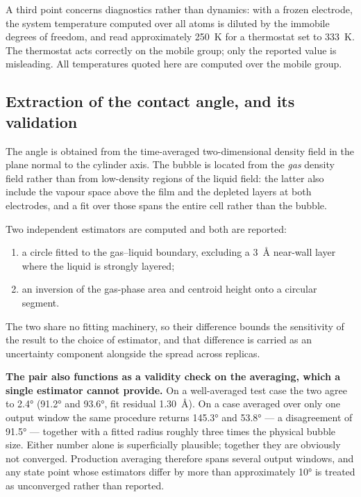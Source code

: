 \documentclass[11pt,a4paper]{article}
\begin{document}
A third point concerns diagnostics rather than dynamics: with a frozen electrode, the system
temperature computed over all atoms is diluted by the immobile degrees of freedom, and read
approximately \SI{250}{\kelvin} for a thermostat set to \SI{333}{\kelvin}. The thermostat acts
correctly on the mobile group; only the reported value is misleading. All temperatures quoted here
are computed over the mobile group.

\subsection{Extraction of the contact angle, and its validation}\label{sec:extraction}

The angle is obtained from the time-averaged two-dimensional density field in the plane normal to the
cylinder axis. The bubble is located from the \emph{gas} density field rather than from low-density
regions of the liquid field: the latter also include the vapour space above the film and the depleted
layers at both electrodes, and a fit over those spans the entire cell rather than the bubble.

Two independent estimators are computed and both are reported:
\begin{enumerate}[leftmargin=*,itemsep=1pt]
\item a circle fitted to the gas--liquid boundary, excluding a \SI{3}{\angstrom} near-wall layer
where the liquid is strongly layered;
\item an inversion of the gas-phase area and centroid height onto a circular segment.
\end{enumerate}
The two share no fitting machinery, so their difference bounds the sensitivity of the result to the
choice of estimator, and that difference is carried as an uncertainty component alongside the spread
across replicas.

\textbf{The pair also functions as a validity check on the averaging, which a single estimator cannot
provide.} On a well-averaged test case the two agree to \ang{2.4} (\ang{91.2} and \ang{93.6}, fit
residual \SI{1.30}{\angstrom}). On a case averaged over only one output window the same procedure
returns \ang{145.3} and \ang{53.8} --- a disagreement of \ang{91.5} --- together with a fitted radius
roughly three times the physical bubble size. Either number alone is superficially plausible;
together they are obviously not converged. Production averaging therefore spans several output
windows, and any state point whose estimators differ by more than approximately \ang{10} is treated
as unconverged rather than reported.
\end{document}
